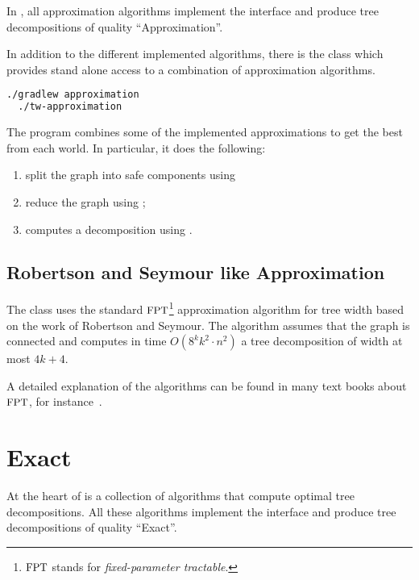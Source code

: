 \documentclass[a4paper, ukenglish, twoside, openright]{jdrasilmanual}
\begin{document}
In \Jdrasil{}, all approximation algorithms implement the interface
 and produce tree decompositions of quality ``Approximation''.

In addition to the different implemented algorithms, there is the
class  which provides stand alone access to a
combination of approximation algorithms.
\begin{lstlisting}[language=bash]
  ./gradlew approximation
  ./tw-approximation
\end{lstlisting}
The program combines some of the implemented approximations to get the
best from each world. In particular, it does the following:
\begin{enumerate}
  \item split the graph into safe components using 
  \item reduce the graph using ;
  \item computes a decomposition using .
\end{enumerate}

\section{Robertson and Seymour like Approximation}
The class  uses the standard
$\Class{FPT}$\footnote{$\Class{FPT}$ stands for \emph{fixed-parameter
    tractable}.} approximation algorithm for tree width based on the work of Robertson and Seymour.
The algorithm assumes that the graph is connected and computes in time \(O(8^k k^2 \cdot n^2)\) a tree decomposition
of width at most \(4k+4\).

A detailed explanation of the algorithms can be found in many text
books about $\Class{FPT}$, for instance~\cite{CyganFKLMPPS2015, FlumGrohe2006}.

\chapter{Exact}
At the heart of \Jdrasil{} is a collection of algorithms that compute
optimal tree decompositions. All these algorithms implement the interface
 and produce tree decompositions of quality ``Exact''.
\end{document}
